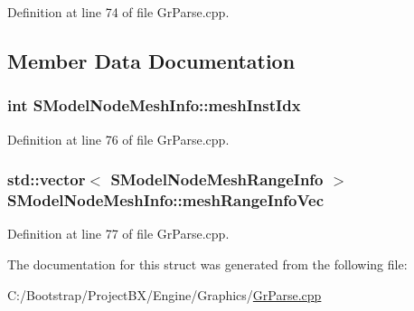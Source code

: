 Definition at line 74 of file GrParse.cpp.

\subsection{Member Data Documentation}
\hypertarget{struct_s_model_node_mesh_info_9320f806f5614c5b16b0f6bfa49a94f1}{
\subsubsection[{meshInstIdx}]{\setlength{\rightskip}{0pt plus 5cm}int {\bf SModelNodeMeshInfo::meshInstIdx}}}
\label{struct_s_model_node_mesh_info_9320f806f5614c5b16b0f6bfa49a94f1}




Definition at line 76 of file GrParse.cpp.\hypertarget{struct_s_model_node_mesh_info_b75268dc7305f850ff82b777f59b61f1}{
\subsubsection[{meshRangeInfoVec}]{\setlength{\rightskip}{0pt plus 5cm}std::vector$<$ {\bf SModelNodeMeshRangeInfo} $>$ {\bf SModelNodeMeshInfo::meshRangeInfoVec}}}
\label{struct_s_model_node_mesh_info_b75268dc7305f850ff82b777f59b61f1}




Definition at line 77 of file GrParse.cpp.

The documentation for this struct was generated from the following file:\begin{CompactItemize}
\item 
C:/Bootstrap/ProjectBX/Engine/Graphics/\hyperlink{_gr_parse_8cpp}{GrParse.cpp}\end{CompactItemize}
